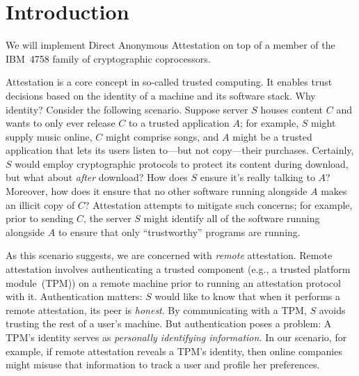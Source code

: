 \section{Introduction}

\begin{comment}
	\emph{PDS:}
	Our goal is to motivate and sketch out our work.
	
	At the moment, I've simply dropped in a copy of our proposal.
	Even if those ideas suffice, we clearly need to adjust the text since
	we're now talking about what we have done rather
	than what we propose to do.
	
	Let's consider improving the ideas.
	
	I want to move away from
	TCG-style attestation to the more general problem of
	\emph{authenticating a remote application}.
	Identifying
	all of the software running on a machine may well uniquely
	identify the machine.
	Authentication without inherently leaking identity enables
	attestation. What other protocols does it enable?
	Voting protocols?
\end{comment}

We will implement Direct Anonymous Attestation on top of
a member of the IBM~4758 family of
cryptographic coprocessors.

Attestation is a core concept in so-called trusted computing.
It enables trust decisions based on the identity of a machine
and its software stack.
Why identity?
Consider the following scenario.
Suppose server $S$ houses content $C$ and wants to
only ever release $C$ to a trusted application $A$;
for example, $S$ might supply music online,
$C$ might comprise songs,
and $A$ might be a trusted application that
lets its users listen to---but not copy---their purchases.
Certainly, $S$ would employ cryptographic protocols to protect
its content during download, but what about \emph{after} download?
How does $S$ ensure it's really talking to $A$? Moreover, how does
it ensure that no other software running alongside $A$ makes an illicit
copy of $C$?
Attestation attempts to mitigate such concerns; for example,
prior to sending $C$, the server $S$ might identify all of the
software running alongside $A$ to ensure that only ``trustworthy'' programs
are running.

As this scenario suggests, we are concerned with \emph{remote} attestation.
Remote attestation involves authenticating a trusted component (e.g., a trusted platform module~(TPM))
on a remote machine prior to running an attestation protocol
with it.
Authentication matters: $S$ would like to know that when it performs a remote attestation,
its peer is \emph{honest}.
By communicating with a TPM, $S$ avoids trusting
the rest of a user's machine.
But authentication poses a problem: A TPM's identity serves as
\emph{personally identifying information.}
In our scenario, for example, if remote attestation reveals a TPM's identity, then
online companies might misuse that information to track a user and profile
her preferences.

